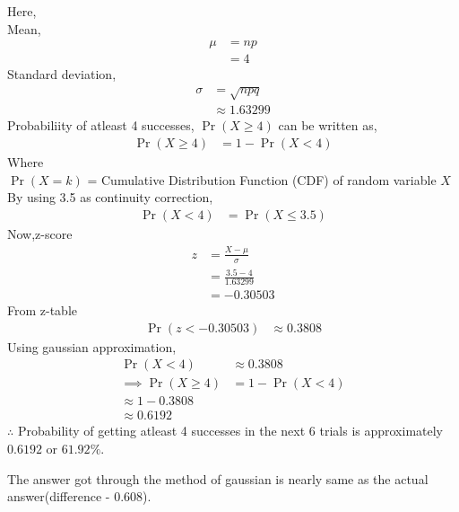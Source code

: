 \documentclass[journal,12pt,onecolumn]{article}
\providecommand{\pr}[1]{\ensuremath{\Pr\left(#1\right)}}
\theoremstyle{remark}
\begin{document}
\begin{enumerate}
		Here, \\ Mean, 
\begin{align}
\mu &= np\\
 &= 4
\end{align}
Standard deviation, 
\begin{align}
\sigma &= \sqrt{npq}\\
&\approx 1.63299
\end{align}
Probabiliity of atleast 4 successes, $\pr{X\geq4}$ can be written as,
\begin{align}
\pr{X\geq4} &= 1-\pr{X<4}
\end{align}
Where\\
$\pr{X=k}$ = Cumulative Distribution Function (CDF) of random variable $X$\\
By using 3.5 as continuity correction,  
\begin{align}
\pr{X<4} &= \pr{X\leq3.5}
\end{align} 
Now,z-score
\begin{align}
z &= \frac{X - \mu}{\sigma} \\
 &= \frac{3.5-4}{1.63299} \\
 &= -0.30503
\end{align}
From z-table
\begin{align}
\pr{z<-0.30503} &\approx0.3808
\end{align}
Using gaussian approximation,
\begin{align}
\pr{X<4} &\approx0.3808 \\
\implies \pr{X\geq4} &= 1-\pr{X<4}\\
\approx 1- 0.3808\\
\approx 0.6192
\end{align}
$\therefore$ Probability of getting atleast 4 successes in the next 6 trials is approximately $0.6192$ or $61.92\%$. 
\end{enumerate}
     The answer got through the method of gaussian is nearly same as the actual answer(difference - 0.608).
\end{document}
